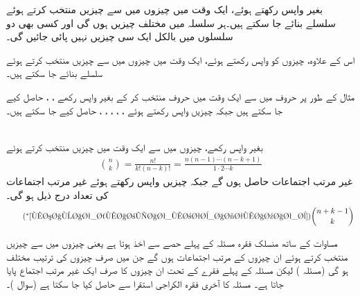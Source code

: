 بغیر واپس رکھتے ہوئے، ایک وقت میں  چیزوں میں سے   چیزیں  منتخب کرتے ہوئے  سلسلے بنائے جا سکتے ہیں۔ہر سلسلہ میں  مختلف چیزیں ہوں گی اور کسی بھی دو سلسلوں میں بالکل ایک سی  چیزیں نہیں پائی جائیں گی۔

اس کے علاوہ، چیزوں کو واپس رکھتے ہوئے،  ایک وقت میں  چیزوں میں سے   چیزیں  منتخب کرتے ہوئے  سلسلے بنائے جا سکتے ہیں۔

مثال کے طور پر  حروف  میں سے ایک وقت میں  حروف منتخب کر کے بغیر واپس رکھے  ، ،  حاصل کیے جا سکتے ہیں جبکہ چیزیں واپس رکھتے ہوئے  ، ، ، ، ،  حاصل کیے جا سکتے ہیں۔

\quad {}\\
بغیر واپس رکھے،  چیزوں میں سے ایک وقت میں  چیزیں منتخب کرتے ہوئے
\begin{align}\label{مساوات_شماریات_مرتب_اجتماعات_ب}
\binom{n}{k}=\frac{n!}{k!(n-k)!}=\frac{n(n-1)\cdots (n-k+1)}{1\cdot 2\cdots k}
\end{align}
غیر مرتب اجتماعات حاصل ہوں گے جبکہ چیزیں واپس رکھتے ہوئے غیر مرتب اجتماعات کی تعداد درج ذیل ہو گی۔
\begin{align*}\tag{$^*$\ref{مساوات_شماریات_مرتب_اجتماعات_ب}}
\binom{n+k-1}{k}
\end{align*}

مساوات  کے ساتھ منسلک فقرہ مسئلہ   کے پہلے حصے سے اخذ ہوتا ہے یعنی  چیزوں میں سے  چیزیں منتخب کرتے ہوئے ان  چیزوں کے مرتب اجتماعات   ہوں گے جن میں صرف چیزوں کی ترتیب مختلف ہو گی (مسئلہ ) لیکن مسئلہ  کے پہلے فقرے کے تحت  ان  چیزوں کا صرف ایک غیر مرتب اجتماع پایا جاتا ہے۔ مسئلہ  کا آخری فقرہ الکراجی استقرا سے حاصل کیا جا سکتا ہے (سوال )۔



